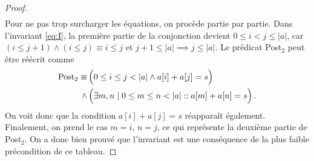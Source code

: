 \documentclass{elsarticle}
\newcommand{\abs}[1]{\left\lvert#1\right\lvert}
\begin{document}
\begin{minipage}[c]{0.65\textwidth}
\begin{proof}
\begin{align*}
\end{align*}
Pour ne pas trop surcharger les équations, on procède partie par partie.
Dans l'invariant \ref{eq:I}, la première partie de la conjonction devient $0 \le i < j \le \abs{a}$,
car $(i \le j+1) \land (i \le j) \equiv i \le j$ et $j+1 \le \abs{a} \implies j \le \abs{a}$.
Le prédicat Post$_2$ peut être réécrit comme
\begin{align*}
\textnormal{Post}_2 \equiv&\,\Big(0 \le i \le j < \abs{a} \land a[i] + a[j] = s\Big)\\
\land&\,\Big(\exists m, n \mid 0 \le m \le n < \abs{a} :: a[m] + a[n] = s\Big)\,.
\end{align*}
On voit donc que la condition $a[i] + a[j] = s$ réapparaît également.
Finalement, on prend le cas $m = i$, $n = j$, ce qui représente la deuxième partie de Post$_2$.
 On a donc bien prouvé que l'invariant est une conséquence de la plus faible précondition de ce tableau.
\end{proof}
\end{minipage}
\end{document}
